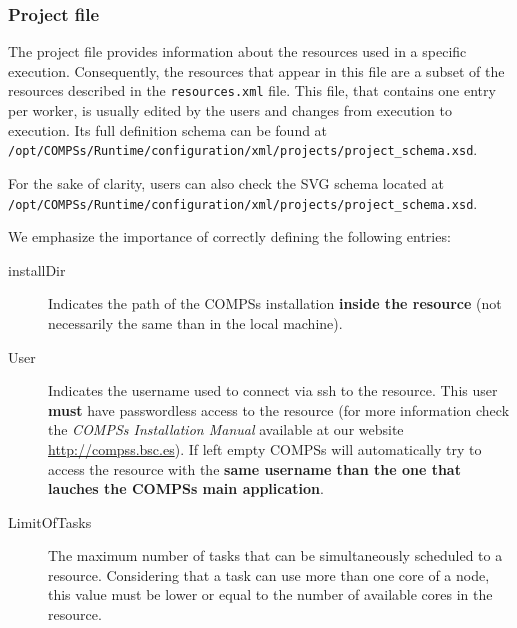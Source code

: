 \subsubsection{Project file}
The project file provides information about the resources used in a specific execution. Consequently, the resources that 
appear in this file are a subset of the resources described in the \texttt{resources.xml} file. This file, that contains
one entry per worker, is usually edited by the users and changes from execution to execution. Its full definition 
schema can be found at 
\texttt{/opt/COMPSs/Runtime/configuration/xml/projects/project\_schema.xsd}.

For the sake of clarity, users can also check the SVG schema located at \\
\texttt{/opt/COMPSs/Runtime/configuration/xml/projects/project\_schema.xsd}.

We emphasize the importance of correctly defining the following entries:
\begin{description}
 \item [installDir] Indicates the path of the COMPSs installation \textbf{inside the resource} (not necessarily the same 
 than in the local machine).
 \item [User] Indicates the username used to connect via ssh to the resource. This user \textbf{must} have passwordless access to the
 resource (for more information check the \textit{COMPSs Installation Manual} available at our website \url{http://compss.bsc.es}).
 If left empty COMPSs will automatically try to access the resource with the \textbf{same username than the one that lauches 
 the COMPSs main application}.
 \item [LimitOfTasks] The maximum number of tasks that can be simultaneously scheduled to a resource. Considering that a task 
 can use more than one core of a node, this value must be lower or equal to the number of available cores in the resource. 
\end{description}


